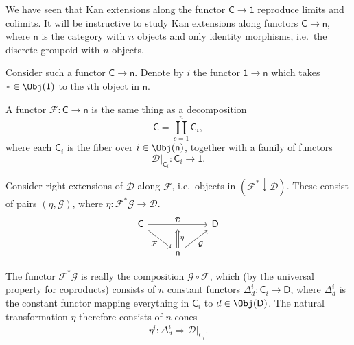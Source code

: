 \documentclass[main.tex]{subfiles}
\begin{document}
\begin{example}
  \label{eg:kan_extension_along_functor_to_discrete_groupoid}
  We have seen that Kan extensions along the functor $\mathsf{C} \to \mathsf{1}$ reproduce limits and colimits. It will be instructive to study Kan extensions along functors $\mathsf{C} \to \mathsf{n}$, where $\mathsf{n}$ is the category with $n$ objects and only identity morphisms, i.e.\ the discrete groupoid with $n$ objects.

  Consider such a functor $\mathsf{C} \to \mathsf{n}$. Denote by $i$ the functor $\mathsf{1} \to \mathsf{n}$ which takes $* \in \Obj(\mathsf{1})$ to the $i$th object in $\mathsf{n}$.

  A functor $\mathcal{F}\colon \mathsf{C} \to \mathsf{n}$ is the same thing as a decomposition
  \begin{equation*}
    \mathsf{C} = \coprod_{c = 1}^{n} \mathsf{C}_{i},
  \end{equation*}
  where each $\mathsf{C}_{i}$ is the fiber over $i \in \Obj(\mathsf{n})$,
  together with a family of functors
  \begin{equation*}
    \mathcal{D}|_{\mathsf{C}_{i}}\colon \mathsf{C}_{i} \to \mathsf{1}.
  \end{equation*}

  Consider right extensions of $\mathcal{D}$ along $\mathcal{F}$, i.e.\ objects in $(\mathcal{F}^{*} \downarrow \mathcal{D})$. These consist of pairs $(\eta, \mathcal{G})$, where $\eta\colon \mathcal{F}^{*}\mathcal{G} \to \mathcal{D}$.
  \begin{equation*}
    \begin{tikzcd}
      \mathsf{C}
      \arrow[dr, swap, "\mathcal{F}"]
      \arrow[rr, ""'{name=U}, "\mathcal{D}"]
      && \mathsf{D}
      \\
      & \mathsf{n}
      \arrow[ur, swap, "\mathcal{G}"]
      \arrow[to=U, Rightarrow, swap, "\eta"]
    \end{tikzcd}
  \end{equation*}

  The functor $\mathcal{F}^{*}\mathcal{G}$ is really the composition $\mathcal{G} \circ \mathcal{F}$, which (by the universal property for coproducts) consists of $n$ constant functors $\Delta^{i}_{d}\colon \mathsf{C}_{i} \to \mathsf{D}$, where $\Delta^{i}_{d}$ is the constant functor mapping everything in $\mathsf{C}_{i}$ to $d \in \Obj(\mathsf{D})$. The natural transformation $\eta$ therefore consists of $n$ cones
  \begin{equation*}
    \eta^{i}\colon \Delta^{i}_{d} \Rightarrow \mathcal{D}|_{\mathsf{C}_{i}}.
  \end{equation*}


\end{example}
\end{document}
